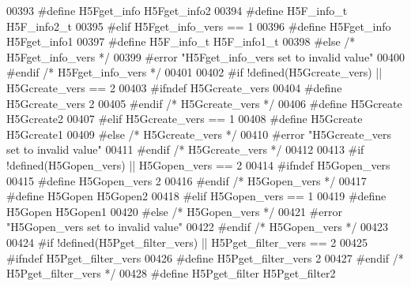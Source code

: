 \begin{DoxyCode}
00393 \textcolor{preprocessor}{  #define H5Fget\_info H5Fget\_info2}
00394 \textcolor{preprocessor}{  #define H5F\_info\_t H5F\_info2\_t}
00395 \textcolor{preprocessor}{#elif H5Fget\_info\_vers == 1}
00396 \textcolor{preprocessor}{  #define H5Fget\_info H5Fget\_info1}
00397 \textcolor{preprocessor}{  #define H5F\_info\_t H5F\_info1\_t}
00398 \textcolor{preprocessor}{#else }\textcolor{comment}{/* H5Fget\_info\_vers */}\textcolor{preprocessor}{}
00399 \textcolor{preprocessor}{  #error "H5Fget\_info\_vers set to invalid value"}
00400 \textcolor{preprocessor}{#endif }\textcolor{comment}{/* H5Fget\_info\_vers */}\textcolor{preprocessor}{}
00401 
00402 \textcolor{preprocessor}{#if !defined(H5Gcreate\_vers) || H5Gcreate\_vers == 2}
00403 \textcolor{preprocessor}{  #ifndef H5Gcreate\_vers}
00404 \textcolor{preprocessor}{    #define H5Gcreate\_vers 2}
00405 \textcolor{preprocessor}{  #endif }\textcolor{comment}{/* H5Gcreate\_vers */}\textcolor{preprocessor}{}
00406 \textcolor{preprocessor}{  #define H5Gcreate H5Gcreate2}
00407 \textcolor{preprocessor}{#elif H5Gcreate\_vers == 1}
00408 \textcolor{preprocessor}{  #define H5Gcreate H5Gcreate1}
00409 \textcolor{preprocessor}{#else }\textcolor{comment}{/* H5Gcreate\_vers */}\textcolor{preprocessor}{}
00410 \textcolor{preprocessor}{  #error "H5Gcreate\_vers set to invalid value"}
00411 \textcolor{preprocessor}{#endif }\textcolor{comment}{/* H5Gcreate\_vers */}\textcolor{preprocessor}{}
00412 
00413 \textcolor{preprocessor}{#if !defined(H5Gopen\_vers) || H5Gopen\_vers == 2}
00414 \textcolor{preprocessor}{  #ifndef H5Gopen\_vers}
00415 \textcolor{preprocessor}{    #define H5Gopen\_vers 2}
00416 \textcolor{preprocessor}{  #endif }\textcolor{comment}{/* H5Gopen\_vers */}\textcolor{preprocessor}{}
00417 \textcolor{preprocessor}{  #define H5Gopen H5Gopen2}
00418 \textcolor{preprocessor}{#elif H5Gopen\_vers == 1}
00419 \textcolor{preprocessor}{  #define H5Gopen H5Gopen1}
00420 \textcolor{preprocessor}{#else }\textcolor{comment}{/* H5Gopen\_vers */}\textcolor{preprocessor}{}
00421 \textcolor{preprocessor}{  #error "H5Gopen\_vers set to invalid value"}
00422 \textcolor{preprocessor}{#endif }\textcolor{comment}{/* H5Gopen\_vers */}\textcolor{preprocessor}{}
00423 
00424 \textcolor{preprocessor}{#if !defined(H5Pget\_filter\_vers) || H5Pget\_filter\_vers == 2}
00425 \textcolor{preprocessor}{  #ifndef H5Pget\_filter\_vers}
00426 \textcolor{preprocessor}{    #define H5Pget\_filter\_vers 2}
00427 \textcolor{preprocessor}{  #endif }\textcolor{comment}{/* H5Pget\_filter\_vers */}\textcolor{preprocessor}{}
00428 \textcolor{preprocessor}{  #define H5Pget\_filter H5Pget\_filter2}

\end{DoxyCode}
